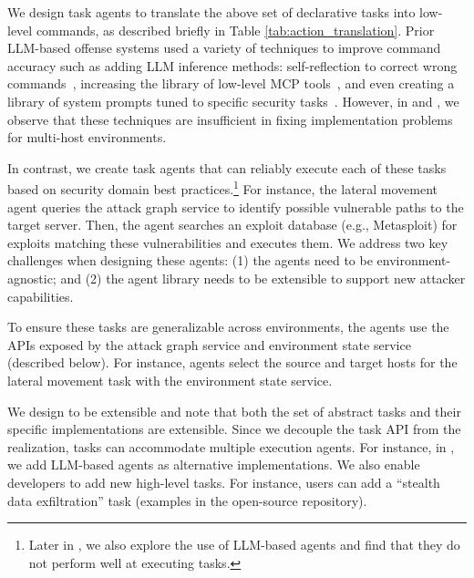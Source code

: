 We design task agents to translate the above set of declarative   tasks into low-level commands,  as described briefly  in Table \ref{tab:action_translation}.
Prior LLM-based offense systems  used a variety of techniques to improve command accuracy such as  adding LLM inference methods: self-reflection to correct wrong commands~\cite{pentestgpt, mayoral2025cai, penheal}, increasing the library of low-level MCP tools~\cite{mayoral2025cai}, and even creating a library of system prompts tuned to specific security tasks~\cite{pentestgpt}.
However, in  and , we observe that these techniques are insufficient in fixing implementation problems for multi-host environments.

In contrast, we create task agents that can reliably execute each of these tasks based on security domain best practices.\footnote{
Later in , we also explore the use of LLM-based agents and find that they do not perform well at executing tasks.
}
For instance, the  lateral movement agent queries the attack graph service to identify possible vulnerable paths to the target server.
Then, the agent searches an exploit database (e.g.,  Metasploit) for exploits matching these vulnerabilities and executes them.
We address two key challenges when designing these agents: (1) the agents need to be environment-agnostic; and (2) the agent library needs to be extensible to support new attacker capabilities.










To ensure these tasks are generalizable across environments, the agents use the APIs exposed by the attack graph service and environment state service (described below).
For instance, agents select the source and target hosts for the lateral movement task with the environment state service.

 We design \sys to be extensible and note  that both the set of abstract tasks and their specific implementations are extensible.
Since we decouple the task API from the realization, tasks can accommodate multiple execution agents.
For instance, in , we add LLM-based agents as alternative implementations.
We also enable developers to add new high-level tasks.
For instance, users can add a ``stealth data exfiltration'' task (examples in the open-source repository).


